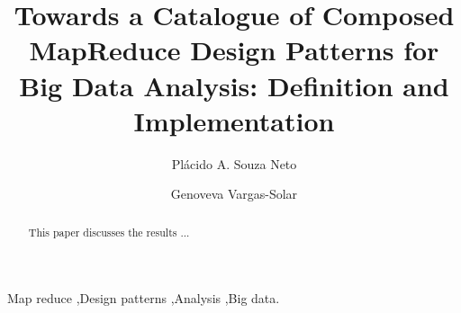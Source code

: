 \documentclass[preprint,12pt]{elsarticle}
\theoremstyle{plain}
\theoremstyle{plain}
\theoremstyle{plain}
\theoremstyle{plain}
\begin{document}
\begin{frontmatter}


 
\title{Towards a Catalogue of Composed MapReduce Design Patterns for Big Data
Analysis: Definition and Implementation}
 

 

\author[inst1]{Pl\'acido A. Souza Neto}
\author[inst2]{Genoveva Vargas-Solar}

 
\address[inst1]{Instituto Federal do Rio Grande do Norte -- Natal, Brazil}
\address[inst2]{CNRS, LIG-LAFMIA, Saint Martin d'H\`eres, France}


\begin{abstract}

This paper discusses the results ...

\end{abstract}

\begin{keyword}
Map reduce \sep Design patterns \sep Analysis \sep Big data.


\end{keyword}

\end{frontmatter}

\end{document}
